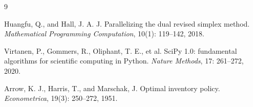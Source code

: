 \begin{thebibliography}{9}

  Huangfu, Q., and Hall, J. A. J. Parallelizing the dual revised simplex method.
  \textit{Mathematical Programming Computation}, 10(1): 119--142, 2018.

  Virtanen, P., Gommers, R., Oliphant, T. E., et al.
  SciPy 1.0: fundamental algorithms for scientific computing in Python.
  \textit{Nature Methods}, 17: 261--272, 2020.

  Arrow, K. J., Harris, T., and Marschak, J. Optimal inventory policy.
  \textit{Econometrica}, 19(3): 250--272, 1951.

\end{thebibliography}
